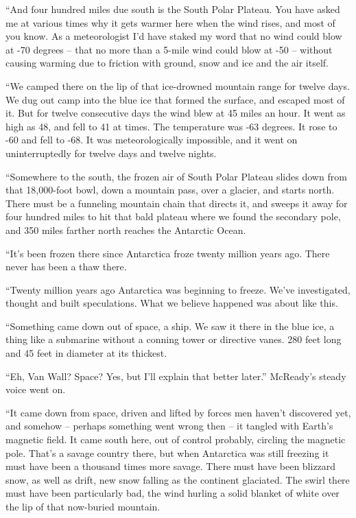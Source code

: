 \documentclass[ebook,oneside,11pt]{memoir}				%
\begin{document}
``And four hundred miles due south is the South Polar Plateau. You have asked me at various times why it gets warmer here when the wind rises, and most of you know. As a meteorologist I'd have staked my word that no wind could blow at -70 degrees -- that no more than a 5-mile wind could blow at -50 -- without causing warming due to friction with ground, snow and ice and the air itself.

``We camped there on the lip of that ice-drowned mountain range for twelve days. We dug out camp into the blue ice that formed the surface, and escaped most of it. But for twelve consecutive days the wind blew at 45 miles an hour. It went as high as 48, and fell to 41 at times. The temperature was -63 degrees. It rose to -60 and fell to -68. It was meteorologically impossible, and it went on uninterruptedly for twelve days and twelve nights.

``Somewhere to the south, the frozen air of South Polar Plateau slides down from that 18,000-foot bowl, down a mountain pass, over a glacier, and starts north. There must be a funneling mountain chain that directs it, and sweeps it away for four hundred miles to hit that bald plateau where we found the secondary pole, and 350 miles farther north reaches the Antarctic Ocean.

``It's been frozen there since Antarctica froze twenty million years ago. There never has been a thaw there.

``Twenty million years ago Antarctica was beginning to freeze. We've investigated, thought and built speculations. What we believe happened was about like this.

``Something came down out of space, a ship. We saw it there in the blue ice, a thing like a submarine without a conning tower or directive vanes. 280 feet long and 45 feet in diameter at its thickest.

``Eh, Van Wall? Space? Yes, but I’ll explain that better later.'' McReady's steady voice went on.

``It came down from space, driven and lifted by forces men haven't discovered yet, and somehow -- perhaps something went wrong then -- it tangled with Earth's magnetic field. It came south here, out of control probably, circling the magnetic pole. That's a savage country there, but when Antarctica was still freezing it must have been a thousand times more savage. There must have been blizzard snow, as well as drift, new snow falling as the continent glaciated. The swirl there must have been particularly bad, the wind hurling a solid blanket of white over the lip of that now-buried mountain.
\end{document}
